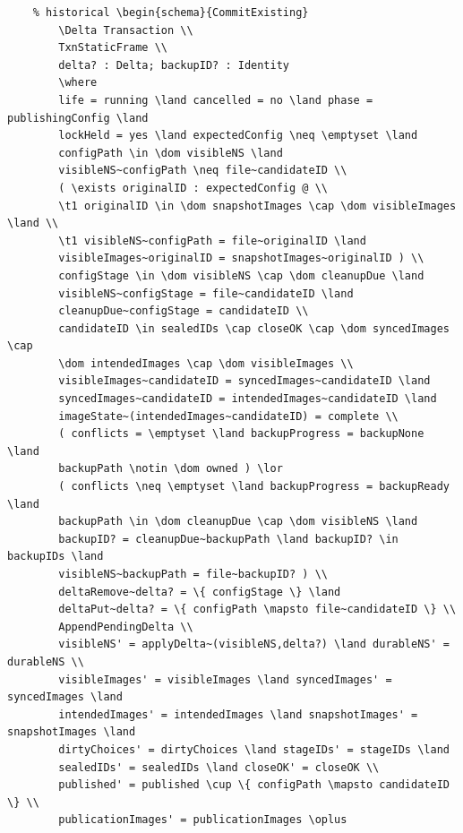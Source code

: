 \documentclass{article}
\begin{document}
\begin{verbatim}
	% historical \begin{schema}{CommitExisting}
		\Delta Transaction \\
		TxnStaticFrame \\
		delta? : Delta; backupID? : Identity
		\where
		life = running \land cancelled = no \land phase = publishingConfig \land
		lockHeld = yes \land expectedConfig \neq \emptyset \land
		configPath \in \dom visibleNS \land
		visibleNS~configPath \neq file~candidateID \\
		( \exists originalID : expectedConfig @ \\
		\t1 originalID \in \dom snapshotImages \cap \dom visibleImages \land \\
		\t1 visibleNS~configPath = file~originalID \land
		visibleImages~originalID = snapshotImages~originalID ) \\
		configStage \in \dom visibleNS \cap \dom cleanupDue \land
		visibleNS~configStage = file~candidateID \land
		cleanupDue~configStage = candidateID \\
		candidateID \in sealedIDs \cap closeOK \cap \dom syncedImages \cap
		\dom intendedImages \cap \dom visibleImages \\
		visibleImages~candidateID = syncedImages~candidateID \land
		syncedImages~candidateID = intendedImages~candidateID \land
		imageState~(intendedImages~candidateID) = complete \\
		( conflicts = \emptyset \land backupProgress = backupNone \land
		backupPath \notin \dom owned ) \lor
		( conflicts \neq \emptyset \land backupProgress = backupReady \land
		backupPath \in \dom cleanupDue \cap \dom visibleNS \land
		backupID? = cleanupDue~backupPath \land backupID? \in backupIDs \land
		visibleNS~backupPath = file~backupID? ) \\
		deltaRemove~delta? = \{ configStage \} \land
		deltaPut~delta? = \{ configPath \mapsto file~candidateID \} \\
		AppendPendingDelta \\
		visibleNS' = applyDelta~(visibleNS,delta?) \land durableNS' = durableNS \\
		visibleImages' = visibleImages \land syncedImages' = syncedImages \land
		intendedImages' = intendedImages \land snapshotImages' = snapshotImages \land
		dirtyChoices' = dirtyChoices \land stageIDs' = stageIDs \land
		sealedIDs' = sealedIDs \land closeOK' = closeOK \\
		published' = published \cup \{ configPath \mapsto candidateID \} \\
		publicationImages' = publicationImages \oplus

\end{verbatim}
\end{document}
